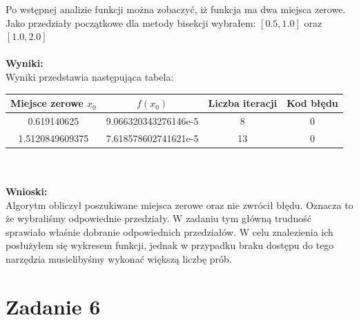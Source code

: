\documentclass[12pt]{article}
\begin{document}
Po wstępnej analizie funkcji można zobaczyć, iż funkcja ma dwa miejsca zerowe. Jako przedziały początkowe dla metody bisekcji wybrałem: $[0.5, 1.0]$ oraz $[1.0, 2.0]$
\\
\\
\noindent \textbf{Wyniki:}\\
Wyniki przedstawia następująca tabela:
\begin{table}[h!]
	\centering
    \label{tab:table2}
    \begin{tabular}{c|c|c|c}
		Miejsce zerowe $x_0$ & $f(x_0)$ & Liczba iteracji & Kod błędu \\
 		\hline
 		\hline
		0.619140625 & 9.066320343276146e-5 & 8 & 0\\
		\hline
		1.5120849609375 & 7.618578602741621e-5 & 13 & 0\\
		\hline
    \end{tabular}
\end{table}
\\
\\
\noindent \textbf{Wnioski:}\\
Algorytm obliczył poszukiwane miejsca zerowe oraz nie zwrócił błędu. Oznacza to że wybraliśmy odpowiednie przedziały. W zadaniu tym główną trudność sprawiało właśnie dobranie odpowiednich przedziałów. W celu znalezienia ich posłużyłem się wykresem funkcji, jednak w przypadku braku dostępu do tego narzędzia musielibyśmy wykonać większą liczbę prób.
\section{Zadanie 6}
\end{document}
